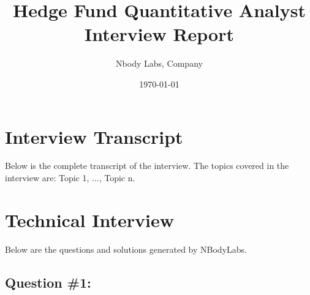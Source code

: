 \documentclass{article}%
\title{Hedge Fund Quantitative Analyst Interview Report}%
\author{Nbody Labs, Company}%
\date{\today}%
\begin{document}
%
\normalsize%
\maketitle%
\section{Interview Transcript}%
\label{sec:InterviewTranscript}%
Below is the complete transcript of the interview. %
The topics covered in the interview are: Topic 1, ..., Topic n.

%
\section{Technical Interview}%
\label{sec:TechnicalInterview}%
Below are the questions and solutions generated by NBodyLabs.%
\subsection{Question \#1: }%
\label{subsec:Question1}%
\end{document}

